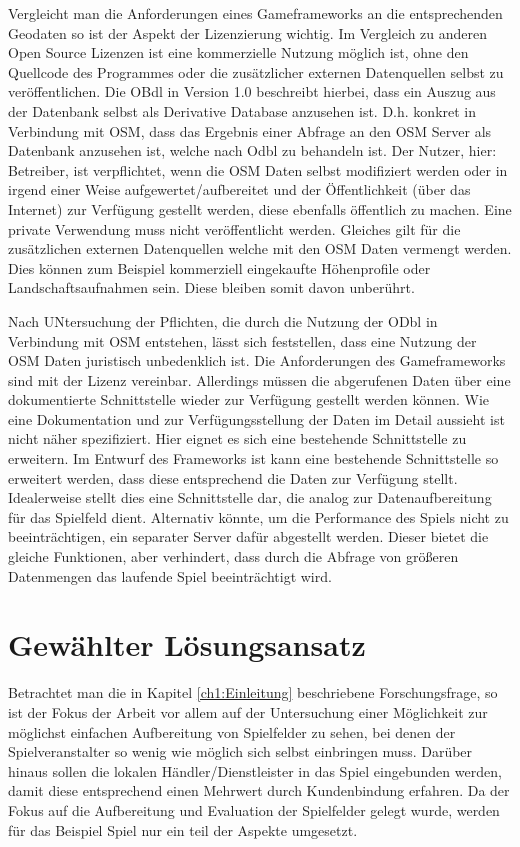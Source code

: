 Vergleicht man die Anforderungen eines Gameframeworks an die entsprechenden Geodaten so ist der Aspekt der Lizenzierung wichtig. Im Vergleich zu anderen Open Source Lizenzen ist eine kommerzielle Nutzung möglich ist, ohne den Quellcode des Programmes oder die zusätzlicher externen Datenquellen selbst zu veröffentlichen.
Die OBdl in Version 1.0 \cite{Odbl.2014} beschreibt hierbei, dass ein Auszug aus der Datenbank selbst als Derivative Database anzusehen ist. D.h. konkret in Verbindung mit OSM, dass das Ergebnis einer Abfrage an den OSM Server als Datenbank anzusehen ist, welche nach Odbl zu behandeln ist. Der Nutzer, hier: Betreiber, ist verpflichtet, wenn die OSM Daten selbst modifiziert werden oder in irgend einer Weise aufgewertet/aufbereitet und der Öffentlichkeit (über das Internet) zur Verfügung gestellt werden, diese ebenfalls öffentlich zu machen. Eine private Verwendung muss nicht veröffentlicht werden. Gleiches gilt für die zusätzlichen externen Datenquellen welche mit den OSM Daten vermengt werden. Dies können zum Beispiel kommerziell eingekaufte Höhenprofile oder Landschaftsaufnahmen sein. Diese bleiben somit davon unberührt.

Nach UNtersuchung  der Pflichten, die durch die Nutzung der ODbl in Verbindung mit OSM entstehen, lässt sich feststellen, dass eine Nutzung der OSM Daten juristisch unbedenklich ist. 
Die Anforderungen des Gameframeworks sind mit der Lizenz vereinbar.
Allerdings müssen die abgerufenen Daten über eine dokumentierte Schnittstelle wieder zur Verfügung gestellt werden können.
Wie eine Dokumentation und zur Verfügungsstellung der Daten im Detail aussieht ist nicht näher spezifiziert. Hier eignet es sich eine bestehende Schnittstelle zu erweitern. Im Entwurf des Frameworks ist kann eine bestehende Schnittstelle so erweitert werden, dass diese entsprechend die Daten zur Verfügung stellt. Idealerweise stellt dies eine Schnittstelle dar, die analog zur Datenaufbereitung für das Spielfeld dient. Alternativ könnte, um die Performance des Spiels nicht zu beeinträchtigen, ein separater Server dafür abgestellt werden. Dieser bietet die gleiche Funktionen, aber verhindert, dass durch die Abfrage von größeren Datenmengen das laufende Spiel beeinträchtigt wird.

\section{Gewählter Lösungsansatz}
\label{ch4:s:choosen_solution}

Betrachtet man die in Kapitel \ref{ch1:Einleitung} beschriebene Forschungsfrage, so ist der Fokus der Arbeit vor allem auf der Untersuchung einer Möglichkeit zur möglichst einfachen Aufbereitung von Spielfelder zu sehen, bei denen der Spielveranstalter so wenig wie möglich sich selbst einbringen muss. Darüber hinaus sollen die lokalen Händler/Dienstleister in das Spiel eingebunden werden, damit diese entsprechend einen Mehrwert durch Kundenbindung erfahren.
Da der Fokus auf die Aufbereitung und Evaluation der Spielfelder gelegt wurde, werden für das Beispiel Spiel nur ein teil der Aspekte umgesetzt.

